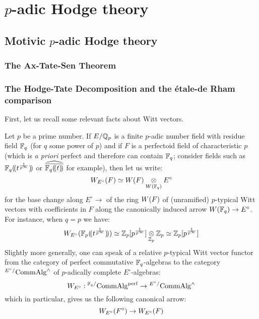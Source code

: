 \chapter{\texorpdfstring{$p$}{}-adic Hodge theory}
    \begin{abstract}
        
    \end{abstract}
    
    \minitoc
    
    \section{Motivic \texorpdfstring{$p$}{}-adic Hodge theory}
        \subsection{The Ax-Tate-Sen Theorem}
    
        \subsection{The Hodge-Tate Decomposition and the \'etale-de Rham comparison}
            First, let us recall some relevant facts about Witt vectors.
            \begin{convention} \label{conv: relative_witt_vectors}
                Let $p$ be a prime number. If $E/\mathbb{Q}_p$ is a finite $p$-adic number field with residue field $\mathbb{F}_q$ (for $q$ some power of $p$) and if $F$ is a perfectoid field of characteristic $p$ (which is \textit{a priori} perfect and therefore can contain $\mathbb{F}_q$; consider fields such as $\mathbb{F}_q(\!(t^{\frac{1}{p^{\infty}}})\!)$ or $\widehat{\overline{\mathbb{F}_q(\!(t)\!)}}$ for example), then let us write:
                    $$\Witt_{E^{\circ}}(F) \cong \Witt(F) \tensor_{\Witt(\F_q)} E^{\circ}$$
                for the base change along $E^{\circ} \to $ of the ring $W(F)$ of (unramified) $p$-typical Witt vectors with coefficients in $F$ along the canonically induced arrow $W(\mathbb{F}_q) \to E^{\circ}$. For instance, when $q = p$ we have:
                    $$\Witt_{E^{\circ}}(\F_p(\!(t^{\frac{1}{p^{\infty}}})\!)) \cong \Z_p[p^{\frac{1}{p^{\infty}}}] \tensor_{\Z_p} \Z_p \cong \Z_p[p^{\frac{1}{p^{\infty}}}]$$
                Slightly more generally, one can speak of a relative $p$-typical Witt vector functor from the category of perfect commutative $\mathbb{F}_q$-algebras to the category ${}^{E^{\circ}/}\mathrm{Comm}\mathrm{Alg}^{\wedge}$ of $p$-adically complete $E^{\circ}$-algebras:
                    $$W_{E^{\circ}}: {}^{\mathbb{F}_q/}\mathrm{Comm}\mathrm{Alg}^{\mathrm{perf}} \to {}^{E^{\circ}/}\mathrm{Comm}\mathrm{Alg}^{\wedge}$$
                which in particular, gives us the following canonical arrow:
                    $$W_{E^{\circ}}(F^{\circ}) \to W_{E^{\circ}}(F)$$
            \end{convention}
        
